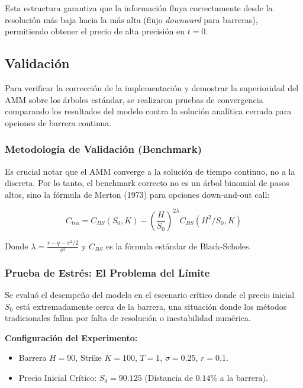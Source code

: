 Esta estructura garantiza que la información fluya correctamente desde la resolución más baja hacia la más alta (flujo \textit{downward} para barreras), permitiendo obtener el precio de alta precisión en $t=0$.
\subsection{Validación} 
\label{sec:validacion_arboles}

Para verificar la corrección de la implementación y demostrar la superioridad del AMM sobre los árboles estándar, se realizaron pruebas de convergencia comparando los resultados del modelo contra la solución analítica cerrada para opciones de barrera continua.

\subsubsection{Metodología de Validación (Benchmark)} 

Es crucial notar que el AMM converge a la solución de tiempo continuo, no a la discreta. Por lo tanto, el benchmark correcto no es un árbol binomial de pasos altos, sino la fórmula de Merton (1973) para opciones down-and-out call:

\begin{equation} 
  C_{teo} = C_{BS}(S_0, K) - \left( \frac{H}{S_0} \right)^{2\lambda} C_{BS}(H^2/S_0, K) \label{eq:merton_benchmark} 
\end{equation} 

Donde $\lambda=\frac {r-q-\sigma^2/2} {\sigma^2}$ y $C_{BS}$ es la fórmula estándar de Black-Scholes.

\subsubsection{Prueba de Estrés: El Problema del Límite} 

Se evaluó el desempeño del modelo en el escenario crítico donde el precio inicial $S_0$ está extremadamente cerca de la barrera, una situación donde los métodos tradicionales fallan por falta de resolución o inestabilidad numérica.

\textbf{Configuración del Experimento:} 

\begin{itemize} 
  \item Barrera $H=90$, Strike $K=100$, $T=1$, $\sigma=0.25$, $r=0.1$. 
  
  \item Precio Inicial Crítico: $S_0=90.125$ (Distancia de $0.14\%$ a la barrera). 
\end{itemize}


